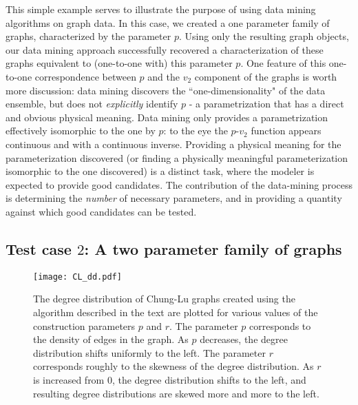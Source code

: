 This simple example serves to illustrate the purpose of using data
mining algorithms on graph data.
% 
In this case, we created a one parameter family of graphs,
characterized by the parameter $p$.
% 
Using only the resulting graph objects, our data mining approach
successfully recovered a characterization of these graphs equivalent
to (one-to-one with) this parameter $p$.
% 
One feature of this one-to-one correspondence between $p$ and the
$v_2$ component of the graphs is worth more discussion: data mining
discovers the ``one-dimensionality" of the data ensemble, but does not
{\em explicitly} identify $p$ - a parametrization that has a direct
and obvious physical meaning.
% 
Data mining only provides a parametrization effectively isomorphic to
the one by $p$: to the eye the $p$-$v_2$ function appears continuous
and with a continuous inverse.
% 
Providing a physical meaning for the parameterization discovered (or
finding a physically meaningful parameterization isomorphic to the one
discovered) is a distinct task, where the modeler is expected to
provide good candidates.
% 
The contribution of the data-mining process is determining the {\em
  number} of necessary parameters, and in providing a quantity against
which good candidates can be tested.


\subsection{\label{ss:cl} Test case $2$: A two parameter family of
  graphs}

\begin{figure}
  \begin{center}
    \texttt{[image: CL\_dd.pdf]}
    \caption{\label{fig:CL} The degree distribution of Chung-Lu graphs
      created using the algorithm described in the text are plotted
      for various values of the construction parameters $p$ and
      $r$. The parameter $p$ corresponds to the density of edges in
      the graph. As $p$ decreases, the degree distribution shifts
      uniformly to the left.  The parameter $r$ corresponds roughly to
      the skewness of the degree distribution.  As $r$ is increased
      from $0$, the degree distribution shifts to the left, and
      resulting degree distributions are skewed more and more to the
      left.  }
  \end{center}
\end{figure}


